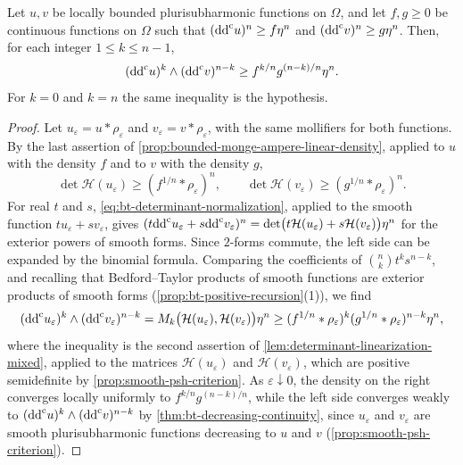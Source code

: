 \begin{corollary}\label{cor:bounded-mixed-continuous-density}
Let $u,v$ be locally bounded plurisubharmonic functions on $\Omega$, and let $f,g\ge0$ be continuous functions on $\Omega$ such that $(\mathrm{dd}^{\mathrm{c}} u)^n\ge f\eta^n$ and $(\mathrm{dd}^{\mathrm{c}} v)^n\ge g\eta^n$. Then, for each integer $1\le k\le n-1$,
\[
 (\mathrm{dd}^{\mathrm{c}} u)^k\wedge(\mathrm{dd}^{\mathrm{c}} v)^{n-k}\ge f^{k/n}g^{(n-k)/n}\eta^n.
\]
For $k=0$ and $k=n$ the same inequality is the hypothesis.
\end{corollary}
\begin{proof}
Let $u_\varepsilon=u*\rho_\varepsilon$ and $v_\varepsilon=v*\rho_\varepsilon$, with the same mollifiers for both functions. By the last assertion of \cref{prop:bounded-monge-ampere-linear-density}, applied to $u$ with the density $f$ and to $v$ with the density $g$,
\[
 \det\mathcal H(u_\varepsilon)\ge(f^{1/n}*\rho_\varepsilon)^n,
 \qquad
 \det\mathcal H(v_\varepsilon)\ge(g^{1/n}*\rho_\varepsilon)^n.
\]
For real $t$ and $s$, \eqref{eq:bt-determinant-normalization}, applied to the smooth function $tu_\varepsilon+sv_\varepsilon$, gives $(t\mathrm{dd}^{\mathrm{c}} u_\varepsilon+s\mathrm{dd}^{\mathrm{c}} v_\varepsilon)^n=\det\bigl(t\mathcal H(u_\varepsilon)+s\mathcal H(v_\varepsilon)\bigr)\eta^n$ for the exterior powers of smooth forms. Since $2$-forms commute, the left side can be expanded by the binomial formula. Comparing the coefficients of $\binom nkt^ks^{n-k}$, and recalling that Bedford--Taylor products of smooth functions are exterior products of smooth forms (\cref{prop:bt-positive-recursion}(1)), we find
\[
 (\mathrm{dd}^{\mathrm{c}} u_\varepsilon)^k\wedge(\mathrm{dd}^{\mathrm{c}} v_\varepsilon)^{n-k}=M_k\bigl(\mathcal H(u_\varepsilon),\mathcal H(v_\varepsilon)\bigr)\eta^n\ge(f^{1/n}*\rho_\varepsilon)^k(g^{1/n}*\rho_\varepsilon)^{n-k}\eta^n,
\]
where the inequality is the second assertion of \cref{lem:determinant-linearization-mixed}, applied to the matrices $\mathcal H(u_\varepsilon)$ and $\mathcal H(v_\varepsilon)$, which are positive semidefinite by \cref{prop:smooth-psh-criterion}. As $\varepsilon\downarrow0$, the density on the right converges locally uniformly to $f^{k/n}g^{(n-k)/n}$, while the left side converges weakly to $(\mathrm{dd}^{\mathrm{c}} u)^k\wedge(\mathrm{dd}^{\mathrm{c}} v)^{n-k}$ by \cref{thm:bt-decreasing-continuity}, since $u_\varepsilon$ and $v_\varepsilon$ are smooth plurisubharmonic functions decreasing to $u$ and $v$ (\cref{prop:smooth-psh-criterion}).
\end{proof}
